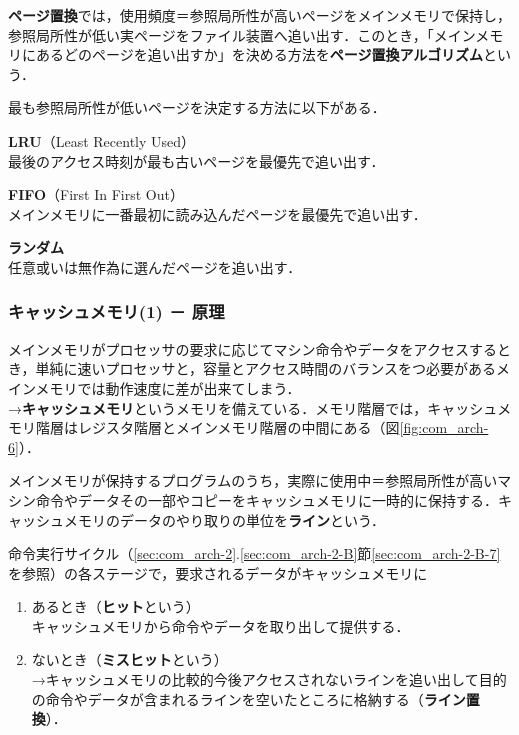 \textbf{ページ置換}では，使用頻度＝参照局所性が高いページをメインメモリで保持し，参照局所性が低い実ページをファイル装置へ追い出す．このとき，「メインメモリにあるどのページを追い出すか」を決める方法を\textbf{ページ置換アルゴリズム}という．

最も参照局所性が低いページを決定する方法に以下がある．
\begin{enumerate}[label=\textbf{[\arabic*]}, labelsep=10pt, leftmargin=23pt]
	\item \textbf{LRU}（Least Recently Used）\\
		最後のアクセス時刻が最も古いページを最優先で追い出す．
	\item \textbf{FIFO}（First In First Out）\\
		メインメモリに一番最初に読み込んだページを最優先で追い出す．
	\item \textbf{ランダム}\\
		任意或いは無作為に選んだページを追い出す．
\end{enumerate}



\subsubsection{キャッシュメモリ(1) － 原理}\label{sec:com_arch-2-D-9}

メインメモリがプロセッサの要求に応じてマシン命令やデータをアクセスするとき，単純に速いプロセッサと，容量とアクセス時間のバランスをつ必要があるメインメモリでは動作速度に差が出来てしまう．\\
→\textbf{キャッシュメモリ}というメモリを備えている．メモリ階層では，キャッシュメモリ階層はレジスタ階層とメインメモリ階層の中間にある（図\ref{fig:com_arch-6}）．

メインメモリが保持するプログラムのうち，実際に使用中＝参照局所性が高いマシン命令やデータその一部やコピーをキャッシュメモリに一時的に保持する．キャッシュメモリのデータのやり取りの単位を\textbf{ライン}という．

命令実行サイクル（\ref{sec:com_arch-2}.\ref{sec:com_arch-2-B}節\ref{sec:com_arch-2-B-7}を参照）の各ステージで，要求されるデータがキャッシュメモリに
\begin{enumerate}[label=\textbf{(\alph*)}, labelsep=10pt, leftmargin=23pt]
	\item \textsf{ある}とき（\textbf{ヒット}という）\\
		キャッシュメモリから命令やデータを取り出して提供する．
	\item \textsf{ない}とき（\textbf{ミスヒット}という）\\
		→キャッシュメモリの比較的今後アクセスされないラインを追い出して目的の命令やデータが含まれるラインを空いたところに格納する（\textbf{ライン置換}）．
\end{enumerate}



